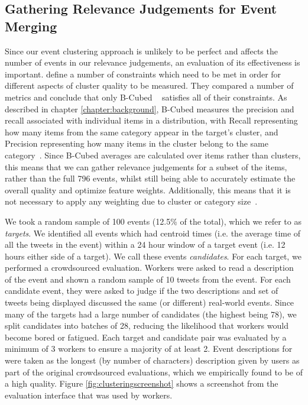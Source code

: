 \subsection{Gathering Relevance Judgements for Event Merging}
\label{sec:clustering}
\label{collection:sec:eval}
Since our event clustering approach is unlikely to be perfect and affects the number of events in our relevance judgements, an evaluation of its effectiveness is important.
\cite{Amigo:2009:CEC:1555682.1555686} define a number of constraints which need to be met in order for different aspects of cluster quality to be measured.
They compared a number of metrics and conclude that only B-Cubed ~\citep{Bagga:1998:ECC:980845.980859} satisfies all of their constraints.
As described in chapter \ref{chapter:background}, B-Cubed measures the precision and recall associated with individual items in a distribution, with Recall representing how many items from the same category appear in the target's cluster, and Precision representing how many items in the cluster belong to the same category~\citep{Amigo:2009:CEC:1555682.1555686}.
Since B-Cubed averages are calculated over items rather than clusters, this means that we can gather relevance judgements for a subset of the items, rather than the full 796 events, whilst still being able to accurately estimate the overall quality and optimize feature weights.
Additionally, this means that it is not necessary to apply any weighting due to cluster or category size~\citep{Amigo:2009:CEC:1555682.1555686}.

We took a random sample of 100 events (12.5\% of the total), which we refer to as \emph{targets}.
We identified all events which had centroid times (i.e. the average time of all the tweets in the event) within a 24 hour window of a target event (i.e. 12 hours either side of a target).
We call these events \emph{candidates}.
For each target, we performed a crowdsourced evaluation.
Workers were asked to read a description of the event and shown a random sample of 10 tweets from the event.
For each candidate event, they were asked to judge if the two descriptions and set of tweets being displayed discussed the same (or different) real-world events.
Since many of the targets had a large number of candidates (the highest being 78), we split candidates into batches of 28, reducing the likelihood that workers would become bored or fatigued.
Each target and candidate pair was evaluated by a minimum of 3 workers to ensure a majority of at least 2.
Event descriptions for were taken as the longest (by number of characters) description given by users as part of the original crowdsourced evaluations, which we empirically found to be of a high quality.
Figure \ref{fig:clusteringscreenshot} shows a screenshot from the evaluation interface that was used by workers.

